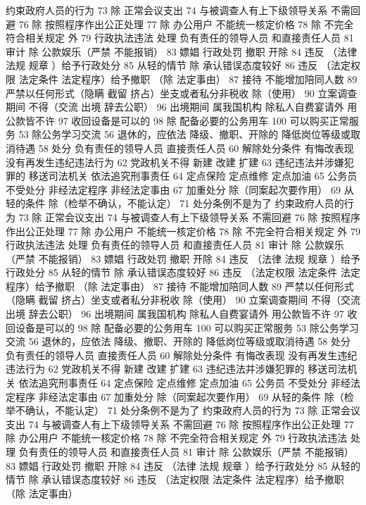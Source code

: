 \documentclass[11pt]{ctexart}
\begin{document}
约束政府人员的行为
73 除 正常会议支出
74 与被调查人有上下级领导关系 不需回避
76 除 按照程序作出公正处理
77 除 办公用户
不能统一核定价格
78 除 不完全符合相关规定 外
79 行政执法违法 处理
负有责任的领导人员
和直接责任人员
81 审计
除 公款娱乐（严禁 不能报销）
83 嫖娼 行政处罚
撤职 开除
84 违反 （法律 法规 规章 ）给予行政处分
85 从轻的情节
除 承认错误态度较好
86 违反 （法定权限 法定条件 法定程序）给予撤职
（除 法定事由）
87 接待 不能增加陪同人数
89 严禁以任何形式（隐瞒 截留 挤占）坐支或者私分非税收
除（使用）
90 立案调查期间 不得（交流 出境 辞去公职）
96 出境期间 属我国机构 除私人自费宴请外 用公款皆不许
97 收回设备是可以的
98 除 配备必要的公务用车
100 可以购买正常服务
53 除公务学习交流
56 退休的，应依法
降级、撤职、开除的 降低岗位等级或取消待遇
58 处分
负有责任的领导人员
直接责任人员
60 解除处分条件
有悔改表现
没有再发生违纪违法行为
62 党政机关不得
新建 改建 扩建
63 违纪违法并涉嫌犯罪的
移送司法机关
依法追究刑事责任
64 定点保险 定点维修 定点加油
65 公务员 不受处分
非经法定程序
非经法定事由
67 加重处分
除（同案起次要作用）
69 从轻的条件
除（检举不确认，不能认定）
71 处分条例不是为了
约束政府人员的行为
73 除 正常会议支出
74 与被调查人有上下级领导关系 不需回避
76 除 按照程序作出公正处理
77 除 办公用户
不能统一核定价格
78 除 不完全符合相关规定 外
79 行政执法违法 处理
负有责任的领导人员
和直接责任人员
81 审计
除 公款娱乐（严禁 不能报销）
83 嫖娼 行政处罚
撤职 开除
84 违反 （法律 法规 规章 ）给予行政处分
85 从轻的情节
除 承认错误态度较好
86 违反 （法定权限 法定条件 法定程序）给予撤职
（除 法定事由）
87 接待 不能增加陪同人数
89 严禁以任何形式（隐瞒 截留 挤占）坐支或者私分非税收
除（使用）
90 立案调查期间 不得（交流 出境 辞去公职）
96 出境期间 属我国机构 除私人自费宴请外 用公款皆不许
97 收回设备是可以的
98 除 配备必要的公务用车
100 可以购买正常服务
53 除公务学习交流
56 退休的，应依法
降级、撤职、开除的 降低岗位等级或取消待遇
58 处分
负有责任的领导人员
直接责任人员
60 解除处分条件
有悔改表现
没有再发生违纪违法行为
62 党政机关不得
新建 改建 扩建
63 违纪违法并涉嫌犯罪的
移送司法机关
依法追究刑事责任
64 定点保险 定点维修 定点加油
65 公务员 不受处分
非经法定程序
非经法定事由
67 加重处分
除（同案起次要作用）
69 从轻的条件
除（检举不确认，不能认定）
71 处分条例不是为了
约束政府人员的行为
73 除 正常会议支出
74 与被调查人有上下级领导关系 不需回避
76 除 按照程序作出公正处理
77 除 办公用户
不能统一核定价格
78 除 不完全符合相关规定 外
79 行政执法违法 处理
负有责任的领导人员
和直接责任人员
81 审计
除 公款娱乐（严禁 不能报销）
83 嫖娼 行政处罚
撤职 开除
84 违反 （法律 法规 规章 ）给予行政处分
85 从轻的情节
除 承认错误态度较好
86 违反 （法定权限 法定条件 法定程序）给予撤职
（除 法定事由）
\end{document}

